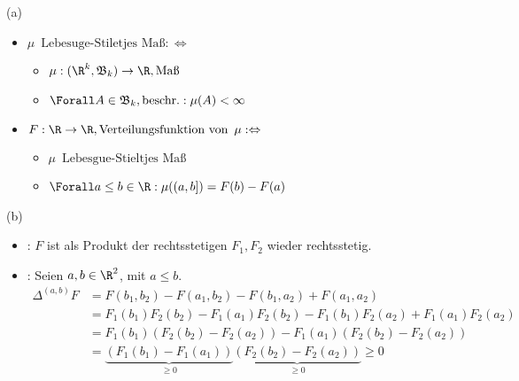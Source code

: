 \begin{solution}

(a)

\begin{itemize}

  \item $\mu \enspace \text{Lebesuge-Stiletjes Maß} : \Leftrightarrow$
  \begin{itemize}
    \item $\mu: (\R^k, \mathfrak{B}_k) \to \R, \text{Maß}$
    \item $\Forall A \in \mathfrak{B}_k, \text{beschr.}: \mu(A) < \infty$
  \end{itemize}

  \item $F: \R \to \R, \text{Verteilungsfunktion von} \enspace \mu : \Leftrightarrow$
  \begin{itemize}
    \item $\mu \enspace \text{Lebesgue-Stieltjes Maß}$
    \item $\Forall a \leq b \in \R: \mu((a, b]) = F(b) - F(a)$
  \end{itemize}

\end{itemize}

(b)

\begin{itemize}

  \item {}: $F$ ist als Produkt der rechtsstetigen $F_1, F_2$ wieder rechtsstetig.

  \item {}: Seien $a, b \in \R^2$, mit $a \leq b$.
  \begin{align*}
    \Delta^{(a, b)} F
    & =
    F(b_1, b_2) - F(a_1, b_2) - F(b_1, a_2) + F(a_1, a_2) \\
    & =
    F_1(b_1) F_2(b_2) -
    F_1(a_1) F_2(b_2) -
    F_1(b_1) F_2(a_2) +
    F_1(a_1) F_2(a_2) \\
    & =
    F_1(b_1) (F_2(b_2) - F_2(a_2)) -
    F_1(a_1) (F_2(b_2) - F_2(a_2)) \\
    & =
    \underbrace{(F_1(b_1) - F_1(a_1))}_{\geq 0}
    \underbrace{(F_2(b_2) - F_2(a_2))}_{\geq 0}
    \geq 0
  \end{align*}

\end{itemize}

\end{solution}

